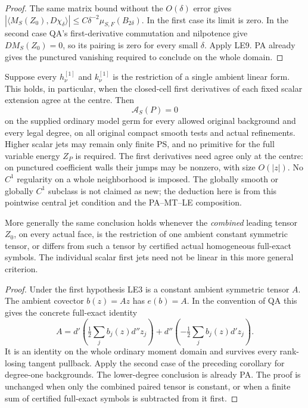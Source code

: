 \begin{proof}
The same matrix bound without the $O(\delta)$ error gives
$|\langle M_S(Z_0),D\chi_\delta\rangle|
\le C\delta^{-2}\mu_{S,F}(B_{2\delta})$.
In the first case its limit is zero.  In the second case QA's
first-derivative commutation and nilpotence give
$D M_S(Z_0)=0$, so its pairing is zero for every small
$\delta$.  Apply LE9.  PA already gives the punctured
vanishing required to conclude on the whole domain.
\end{proof}

\begin{corollary}
\label{cor:r13-linear-first-jet-quadratic-action}
Suppose every $h_\nu^{[1]}$ and $k_\nu^{[1]}$ is the
restriction of a single ambient linear form.  This holds, in
particular, when the closed-cell first derivatives of each
fixed scalar extension agree at the centre.  Then
\[
                         \mathcal A_S(P)=0
 \tag{LE13a}
\]
on the supplied ordinary model germ for every allowed original
background and every legal degree, on all original compact
smooth tests and actual refinements.  Higher scalar jets may
remain only finite PS, and no primitive for the full variable
energy $Z_P$ is required.  The first derivatives need agree
only at the centre: on punctured coefficient walls their
jumps may be nonzero, with size $O(|z|)$.  No $C^1$
regularity on a whole neighborhood is imposed.  The globally
smooth or globally $C^1$ subclass is not claimed as new;
the deduction here is from this pointwise central jet
condition and the PA--MT--LE composition.

More generally the same conclusion holds whenever the
\emph{combined} leading tensor $Z_0$, on every actual face,
is the restriction of one ambient constant symmetric tensor,
or differs from such a tensor by certified actual homogeneous
full-exact symbols.  The individual scalar first jets need
not be linear in this more general criterion.
\end{corollary}

\begin{proof}
Under the first hypothesis LE3 is a constant ambient symmetric
tensor $A$.  The ambient covector $b(z)=Az$ has
$e(b)=A$.  In the convention of QA this gives the concrete
full-exact identity
\[
 A=d'\!\left(\tfrac12\sum_j b_j(z)d''z_j\right)
        +d''\!\left(-\tfrac12\sum_j b_j(z)d'z_j\right).
\]
It is an identity on the whole ordinary moment domain and
survives every rank-losing tangent pullback.  Apply the second
case of the preceding corollary for degree-one backgrounds.
The lower-degree conclusion is already PA.  The proof is
unchanged when only the combined paired tensor is constant,
or when a finite sum of certified full-exact symbols is
subtracted from it first.
\end{proof}

